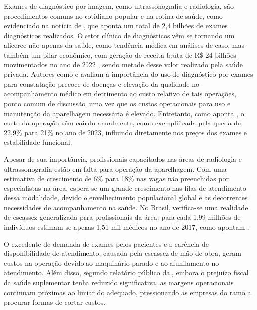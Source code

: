 \label{cap:introducao}

Exames de diagnóstico por imagem, como ultrassonografia e radiologia, são procedimentos comuns no cotidiano popular e na rotina de saúde, como evidenciado na notícia de , que aponta um total de 2,4 bilhões de exames diagnósticos realizados. O setor clínico de diagnósticos vêm se tornando um alicerce não apenas da saúde, como tendência médica em análises de caso, mas também um pilar econômico, com geração de receita bruta de R\$ 24 bilhões movimentados no ano de 2022 \cite{Abramed_2023}, sendo metade desse valor realizado pela saúde privada.
Autores como  e  avaliam a importância do uso de diagnóstico por exames para constatação precoce de doenças e elevação da qualidade no acompanhamento médico em detrimento ao custo relativo de tais operações, ponto comum de discussão, uma vez que os custos operacionais para uso e manutenção da aparelhagem necessária é elevado. Entretanto, como aponta , o custo da operação vêm caindo anualmente, como exemplificada pela queda de 22,9\% para 21\% no ano de 2023, influindo diretamente nos preços dos exames e estabilidade funcional.

Apesar de sua importância, profissionais capacitados nas áreas de radiologia e ultrassonografia estão em falta para operação da aparelhagem. Com uma estimativa de crescimento de 6\% para 18\% nas vagas não preenchidas por especialistas na área, espera-se um grande crescimento nas filas de atendimento dessa modalidade, devido o envelhecimento populacional global e as decorrentes necessidades de acompanhamento na saúde\cite{RSNA_2024}. No Brasil, verifica-se uma realidade de escassez generalizada para profissionais da área: para cada 1,99 milhões de indivíduos estimam-se apenas 1,51 mil médicos no ano de 2017, como apontam .

O excedente de demanda de exames pelos pacientes e a carência de disponibilidade de atendimento, causada pela escassez de mão de obra, geram custos na operação devido ao maquinário parado e ao afunilamento no atendimento. Além disso, segundo relatório público da , embora o prejuízo fiscal da saúde suplementar tenha reduzido significativa, as margens operacionais continuam próximas ao limiar do adequado, pressionando as empresas do ramo a procurar formas de cortar custos.

